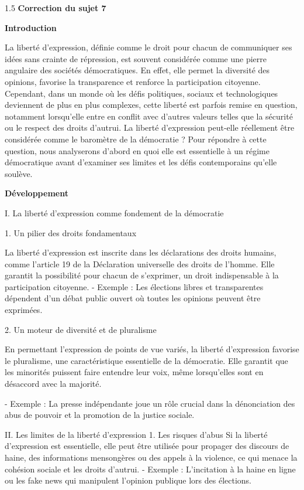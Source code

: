 \documentclass[12pt]{article}
\begin{document}
\begin{spacing}{1.5}
\quad
\quad
\textbf{Correction du sujet 7}

\textbf{Introduction}

La liberté d'expression, définie comme le droit pour chacun de communiquer ses idées sans crainte de répression, est souvent considérée comme une pierre angulaire des sociétés démocratiques. En effet, elle permet la diversité des opinions, favorise la transparence et renforce la participation citoyenne. Cependant, dans un monde où les défis politiques, sociaux et technologiques deviennent de plus en plus complexes, cette liberté est parfois remise en question, notamment lorsqu'elle entre en conflit avec d'autres valeurs telles que la sécurité ou le respect des droits d'autrui. La liberté d'expression peut-elle réellement être considérée comme le baromètre de la démocratie ? Pour répondre à cette question, nous analyserons d'abord en quoi elle est essentielle à un régime démocratique avant d'examiner ses limites et les défis contemporains qu'elle soulève.


\textbf{Développement}

I. La liberté d'expression comme fondement de la démocratie

1. Un pilier des droits fondamentaux
 
   La liberté d'expression est inscrite dans les déclarations des droits humains, comme l'article 19 de la Déclaration universelle des droits de l'homme. Elle garantit la possibilité pour chacun de s'exprimer, un droit indispensable à la participation citoyenne.  
   - Exemple : Les élections libres et transparentes dépendent d'un débat public ouvert où toutes les opinions peuvent être exprimées.  
   
2. Un moteur de diversité et de pluralisme
  
   En permettant l'expression de points de vue variés, la liberté d'expression favorise le pluralisme, une caractéristique essentielle de la démocratie. Elle garantit que les minorités puissent faire entendre leur voix, même lorsqu'elles sont en désaccord avec la majorité. 
   
   - Exemple : La presse indépendante joue un rôle crucial dans la dénonciation des abus de pouvoir et la promotion de la justice sociale.


II. Les limites de la liberté d'expression
1. Les risques d'abus  
   Si la liberté d'expression est essentielle, elle peut être utilisée pour propager des discours de haine, des informations mensongères ou des appels à la violence, ce qui menace la cohésion sociale et les droits d'autrui.  
   - Exemple : L'incitation à la haine en ligne ou les fake news qui manipulent l'opinion publique lors des élections.  
   

\end{spacing}
\end{document}
